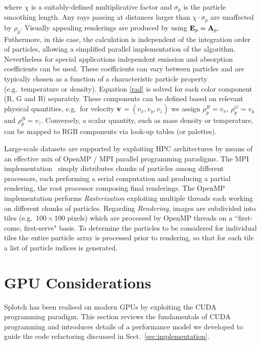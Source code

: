 \documentclass[smallextended]{svjour3}
\begin{document}
\begin{itemize}
where $\chi$ is a suitably-defined multiplicative factor and $\sigma_p$ is the particle smoothing length. Any rays passing at distances larger than $\chi\cdot\sigma_p$ are unaffected by $\rho_p$. Visually appealing renderings are produced by using ${\bf E}_p = {\bf A}_p$. Futhermore, in this case, the calculation is independent of the integration order of particles, allowing a simplified parallel implementation of the algorithm. Nevertheless for special applications independent emission and absorption coefficients can be used. These coefficients
can vary between particles and are typically chosen as a function of a characteristic
particle property (e.g.\ temperature or density).
Equation \eqref{rad} is solved for each color component (R, G and B) separately. These components can be defined based on relevant physical quantities, e.g.\ for velocity $\bf v$$=(v_x, v_y, v_z)$ we assign $\rho_p^{R}=v_x$, $\rho_p^{G}=v_y$ and $\rho_p^{B}=v_z$. Conversely, a scalar quantity, such as mass density or temperature, can be mapped to RGB components via look-up tables (or palettes). 
\end{itemize}
Large-scale datasets are supported by exploiting HPC architectures by means of an effective mix of OpenMP / MPI parallel programming paradigms. The MPI implementation~\cite{jin:high-performance}  simply distributes chunks of particles among different processors, each performing a serial computation and producing a partial rendering, the root processor composing final renderings. The OpenMP implementation performs {\it Rasterization} exploiting multiple threads each working on different chunks of particles. Regarding {\it Rendering}, images are subdivided into tiles (e.g.\ $100 \times 100$ pixels) which are processed by OpenMP threads on a ``first-come, first-serve" basis. To determine the particles to be considered for individual tiles the entire particle array is processed prior to rendering, so that for each tile a list of particle indices is generated.


\section{GPU Considerations}
\label{sec:gpu-code}

Splotch has been realised on modern GPUs by exploiting the CUDA programming paradigm. This section reviews the fundamentals of CUDA programming and introduces details of a performance model we developed to guide the code refactoring discussed in Sect.~\ref{sec:implementation}.  
\end{document}
